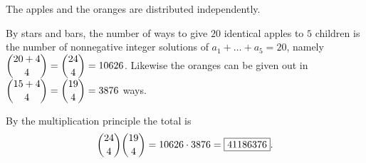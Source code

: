 The apples and the oranges are distributed independently.

By stars and bars, the number of ways to give $20$ identical apples to $5$ children is the number of nonnegative integer solutions of $a_1+\dots+a_5=20$, namely $\dbinom{20+4}{4}=\dbinom{24}{4}=10626$. Likewise the oranges can be given out in $\dbinom{15+4}{4}=\dbinom{19}{4}=3876$ ways.

By the multiplication principle the total is
\[
\dbinom{24}{4}\dbinom{19}{4}=10626\cdot3876=\boxed{41186376}.
\]
